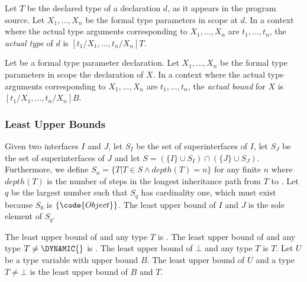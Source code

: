 \documentclass{article}
\begin{document}
\LMHash{}
Let $T$ be the declared type of a declaration $d$,
as it appears in the program source.
Let $X_1, \ldots, X_n$ be the formal type parameters in scope at $d$.
In a context where the actual type arguments corresponding to
$X_1, \ldots, X_n$
are
$t_1, \ldots, t_n$,
the {\em actual type} of $d$ is
$[t_1/X_1, \ldots, t_n/X_n]T$.


\LMHash{}
Let  be a formal type parameter declaration.
Let
$X_1, \ldots, X_n$
be the formal type parameters in scope the declaration of $X$.
In a context where the actual type arguments corresponding to
$X_1, \ldots, X_n$
are
$t_1, \ldots, t_n$,
the {\em actual bound} for $X$ is
$[t_1/X_1, \ldots, t_n/X_n]B$.




\subsubsection{Least Upper Bounds}


\LMHash{}
Given two interfaces $I$ and $J$,
let $S_I$ be the set of superinterfaces of $I$,
let $S_J$ be the set of superinterfaces of $J$
and let $S = (\{I\} \cup S_I) \cap (\{J\} \cup S_J)$.
Furthermore,
we define $S_n = \{T | T \in S \wedge depth(T) = n\}$ for any finite $n$
where $depth(T)$ is the number of steps in the longest inheritance path
from $T$ to .
Let $q$ be the largest number such that $S_q$ has cardinality one,
which must exist because $S_0$ is $\{\code{Object}\}$.
The least upper bound of $I$ and $J$ is the sole element of $S_q$.

\LMHash{}
The least upper bound of \DYNAMIC{} and any type $T$ is \DYNAMIC{}.
The least upper bound of \VOID{} and any type $T \ne \DYNAMIC{}$ is \VOID{}.
The least upper bound of $\bot$ and any type $T$ is $T$.
Let $U$ be a type variable with upper bound $B$.
The least upper bound of $U$ and a type $T \ne \bot$ is the least upper bound of $B$ and $T$.
\end{document}
